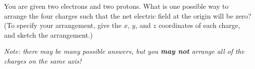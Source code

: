 \question You are given two electrons and two protons. What is one possible way to arrange the four charges such that the net electric field at the origin will be zero? (To specify your arrangement, give the $x$, $y$,  and $z$ coordinates of each charge, and sketch the arrangement.)

\textit{Note: there may be many possible answers, but you \textbf{may not} arrange all of the charges on the same axis!}
